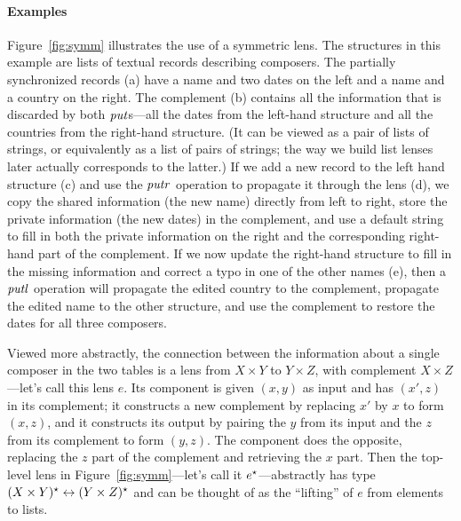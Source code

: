 
\paragraph*{Examples} Figure~\ref{fig:symm} illustrates the use of a
symmetric lens.  
%
The structures in this example are lists of textual records describing
composers. The partially synchronized records (a) have a name and two dates
on the left and a name and a country on the right.
%
The complement (b) contains all the information that is discarded by both
$\mathit{put}$s---all the dates from the left-hand structure and all the countries
from the right-hand structure.  (It can be viewed as a pair of lists of
strings, or equivalently as a list of pairs of strings; the way we build
list lenses later actually corresponds to the latter.)  If we add a
new record to the left hand structure (c) and use the $\mathit{putr}$ operation to
propagate it through the lens (d), we copy the shared information (the new
name) directly from left to right, store the private information (the new
dates) in the complement, and use a default string to fill in both the
private information on the right and the corresponding right-hand part of
the complement.  If we now update the right-hand structure to fill in the
missing information and correct a typo in one of the other names
(e), then a $\mathit{putl}$ operation will propagate the edited country to the
complement, propagate the edited name to the other structure, and use the
complement to restore the dates for all three composers.

Viewed more abstractly, the
connection between the information about a single composer in the two tables
is a lens from $X \times Y$ to $Y \times Z$, with complement $X
\times Z$---let's call this lens $e$.  Its \PUTR{} component is given $(x,y)$ as
input and has $(x',z)$ in its complement; it constructs a new complement by
replacing $x'$ by $x$ to form $(x,z)$, and it constructs its output by
pairing the $y$ from its input and the $z$ from its complement to form
$(y,z)$. The \PUTL{} component does the opposite, replacing the $z$ part of
the complement and retrieving the $x$ part.  Then the
top-level lens in Figure~\ref{fig:symm}---let's call it
$e^\star$---abstractly has type $(X \times Y)^\star \leftrightarrow (Y \times Z)^\star$
and can be thought of as the ``lifting'' of $e$ from elements
to lists.  

